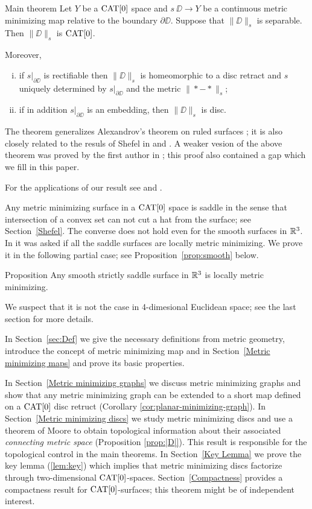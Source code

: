 \documentclass{article}
\begin{document}
\begin{thm}{Main theorem}\label{thm:mainintro}
Let $Y$ be a $\mathop{\rm CAT}\nolimits[0]$ space 
and $s\:\DD\to Y$ be a continuous metric minimizing map relative to the boundary $\partial\DD$.
Suppose that $\|\DD\|_s$  is separable. 
Then $\|\DD\|_s$ is $\mathop{\rm CAT}\nolimits[0]$.

Moreover, 
\begin{enumerate}[(i)]
\item if $s|_{\partial\DD}$ is rectifiable then $\|\DD\|_s$ is homeomorphic to a disc retract
and $s$ uniquely determined by $s|_{\partial\DD}$ and the metric $\|{*}-{*}\|_s$;
\item if in addition $s|_{\partial\DD}$ is an embedding, then $\|\DD\|_s$ is disc.
\end{enumerate}
\end{thm}

The theorem generalizes Alexandrov's theorem on ruled surfaces \cite{A};
it is also closely related to the resuls of Shefel in \cite{shefel-2D} and \cite{shefel-3D}.
A weaker vesion of the above theorem was proved by the first author in \cite{petrunin-metric-min};
this proof also contained a gap which we fill in this paper. 
 

For the applications of our result see \cite{LSW} and \cite{St}.

Any metric minimizing surface in a $\mathop{\rm CAT}\nolimits[0]$ space is saddle 
in the sense that intersection of a convex set can not cut a hat from the surface;
see Section~\ref{Shefel}.
The converse does not hold even for the smooth surfaces in $\mathbb{R}^3$.
In \cite{petrunin-metric-min} it was asked if all the saddle surfaces are locally metric minimizing.
We prove it in the following partial case; 
see Proposition~\ref{prop:smooth} below. 

\begin{thm}{Proposition}
Any smooth strictly saddle surface in $\mathbb{R}^3$ is locally metric minimizing. 
\end{thm}

We suspect that it is not the case in 4-dimesional Euclidean space;
see the last section for more details.

In Section~\ref{sec:Def} we give the necessary definitions from metric geometry, introduce the concept of metric minimizing map
and in Section~\ref{Metric minimizing maps} and prove its basic properties. 

In Section~\ref{Metric minimizing graphs}
we discuss metric minimizing graphs and show that any metric minimizing graph can be extended to a short
map defined on a $\mathop{\rm CAT}\nolimits[0]$ disc retruct (Corollary \ref{cor:planar-minimizing-graph}). 
In Section~\ref{Metric minimizing discs} we study metric minimizing discs and use a theorem of Moore \cite{moore} to obtain topological information about  their associated \emph{connecting metric space} (Proposition \ref{prop:|D|}). 
This result is responsible for 
the topological control in the main theorems. 
In Section~\ref{Key Lemma} we prove the key lemma (\ref{lem:key}) which implies that metric minimizing discs factorize through two-dimensional $\mathop{\rm CAT}\nolimits[0]$-spaces. 
Section~\ref{Compactness} provides a compactness result for $\mathop{\rm CAT}\nolimits[0]$-surfaces;
this theorem might be of independent interest. 
\end{document}
